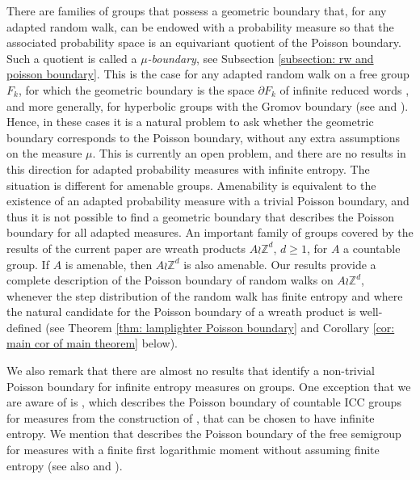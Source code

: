\documentclass[reqno,oneside,11pt]{amsart}
\newcommand{\Z}{\mathbb{Z}}
\theoremstyle{plain}
\theoremstyle{definition}
\begin{document}
 There are families of groups that possess a geometric boundary that, for any adapted random walk, can be endowed with a probability measure so that the associated probability space is an equivariant quotient of the Poisson boundary. Such a quotient is called a \emph{$\mu$-boundary}, see Subsection \ref{subsection: rw and poisson boundary}. This is the case for any adapted random walk on a free group $F_k$, for which the geometric boundary is the space $\partial F_k$ of infinite reduced words \cite[Section 4]{Furstenberg1967}, and more generally, for hyperbolic groups with the Gromov boundary (see \cite[Corollary 1]{Woess1993} and \cite[Theorem 7.6]{Kaimanovich2000}). Hence, in these cases it is a natural problem to ask whether the geometric boundary corresponds to the Poisson boundary, without any extra assumptions on the measure $\mu$. This is currently an open problem, and there are no results in this direction for adapted probability measures with infinite entropy. The situation is different for amenable groups. Amenability is equivalent to the existence of an adapted probability measure with a trivial Poisson boundary, and thus it is not possible to find a geometric boundary that describes the Poisson boundary for all adapted measures. An important family of groups covered by the results of the current paper are wreath products $A\wr \Z^d$, $d\ge 1$, for $A$ a countable group. If $A$ is amenable, then $A\wr \Z^d$ is also amenable. Our results provide a complete description of the Poisson boundary of random walks on $A\wr \Z^d$, whenever the step distribution of the random walk has finite entropy and where the natural candidate for the Poisson boundary of a wreath product is well-defined (see Theorem \ref{thm: lamplighter Poisson boundary} and Corollary \ref{cor: main cor of main theorem} below). 

We also remark that there are almost no results that identify a non-trivial Poisson boundary for infinite entropy measures on groups. One exception that we are aware of is \cite[Theorem A]{ErschlerKaimanovich2023}, which describes the Poisson boundary of countable ICC groups for measures from the construction of \cite{FrischHartmanTamuzVahidi2019}, that can be chosen to have infinite entropy. We mention that \cite{ForghaniKaimanovichINPREP} describes the Poisson boundary of the free semigroup for measures with a finite first logarithmic moment without assuming finite entropy (see also \cite[Theorem 1.2]{ForghaniTiozzo2019} and \cite[Theorem 3.6.3]{ForghaniThesis2015}).

\end{document}
